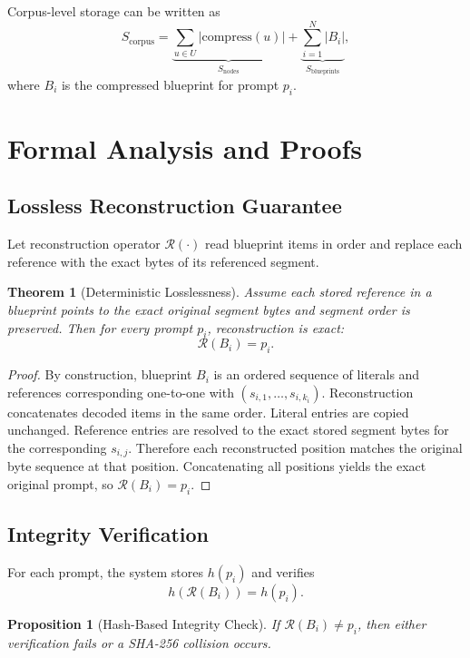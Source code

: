 \documentclass[10pt,conference]{IEEEtran}
\newtheorem{theorem}{Theorem}
\newtheorem{proposition}{Proposition}
\begin{document}
Corpus-level storage can be written as
\begin{equation}
S_{\text{corpus}} = \underbrace{\sum_{u\in U}|\text{compress}(u)|}_{S_{\text{nodes}}} + \underbrace{\sum_{i=1}^{N}|B_i|}_{S_{\text{blueprints}}},
\end{equation}
where $B_i$ is the compressed blueprint for prompt $p_i$.

\section{Formal Analysis and Proofs}
\subsection{Lossless Reconstruction Guarantee}
Let reconstruction operator $\mathcal{R}(\cdot)$ read blueprint items in order and replace each reference with the exact bytes of its referenced segment.

\begin{theorem}[Deterministic Losslessness]
Assume each stored reference in a blueprint points to the exact original segment bytes and segment order is preserved. Then for every prompt $p_i$, reconstruction is exact:
\begin{equation}
\mathcal{R}(B_i)=p_i.
\end{equation}
\end{theorem}

\begin{proof}
By construction, blueprint $B_i$ is an ordered sequence of literals and references corresponding one-to-one with $(s_{i,1},\dots,s_{i,k_i})$. Reconstruction concatenates decoded items in the same order. Literal entries are copied unchanged. Reference entries are resolved to the exact stored segment bytes for the corresponding $s_{i,j}$. Therefore each reconstructed position matches the original byte sequence at that position. Concatenating all positions yields the exact original prompt, so $\mathcal{R}(B_i)=p_i$.
\end{proof}

\subsection{Integrity Verification}
For each prompt, the system stores $h(p_i)$ and verifies
\begin{equation}
h(\mathcal{R}(B_i))=h(p_i).
\end{equation}

\begin{proposition}[Hash-Based Integrity Check]
If $\mathcal{R}(B_i)\neq p_i$, then either verification fails or a SHA-256 collision occurs.
\end{proposition}
\end{document}
